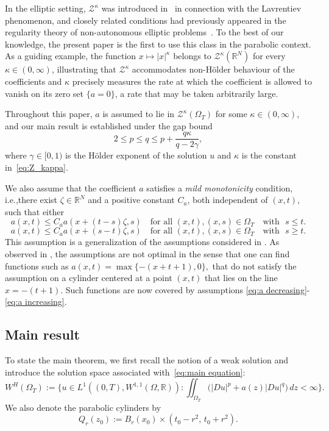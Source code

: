 \documentclass[10pt,a4paper]{amsart}
\numberwithin{equation}{section}
\newcommand{\RR}{\mathds{R}}
\begin{document}
In the elliptic setting, $\mathcal{Z}^{\kappa}$ was introduced
in~\cite{BCFM2023} in connection with the Lavrentiev phenomenon, and
closely related conditions had previously appeared in the regularity theory
of non-autonomous elliptic problems~\cite{HHL_2021, HOK2021, HOK2022}. To the best of
our knowledge, the present paper is the first to use this class in the
parabolic context. As a guiding example, the function $x \mapsto |x|^{\kappa}$
belongs to $\mathcal{Z}^{\kappa}(\RR^N)$ for every $\kappa \in (0,
\infty)$, illustrating that $\mathcal{Z}^{\kappa}$ accommodates
non-H\"older behaviour of the coefficients and $\kappa$
precisely measures the rate at which the coefficient is allowed to vanish on its zero set $\{a=0\}$, a rate that may be taken arbitrarily large.

Throughout this paper, $a$ is assumed to lie in
$\mathcal{Z}^{\kappa}(\Omega_T)$ for some $\kappa \in (0, \infty)$, and our main result is established under the gap bound
\begin{equation}\label{eq:new_upper_bound}
  2 \le p \le q \le p + \frac{q\kappa}{q - 2\gamma},
\end{equation}
where $\gamma \in [0, 1)$ is the H\"older exponent of the solution $u$ and
$\kappa$ is the constant in~\eqref{eq:Z_kappa}.

We also assume that the coefficient $a$ satisfies a \textit{mild monotonicity} condition, i.e.,there exist $\zeta \in \RR^N$ and a positive constant $C_a$, both independent of $(x,t)$, such that either 
\begin{equation}\label{eq:a decreasing}
    a(x,t) \leq C_a a(x+(t-s)\zeta,s) \quad \text{for all } (x,t),(x,s)\in \Omega_T \quad \text{with }\,\, s \leq t.
\end{equation}
\begin{equation}\label{eq:a increasing}
    a(x,t) \leq C_a a(x+(s-t)\zeta,s) \quad \text{for all } (x,t),(x,s)\in \Omega_T \quad \text{with }\,\, s \geq t.
\end{equation}
This assumption is a generalization of the assumptions considered in \cite{SS25}. As observed in \cite{SS25}, the assumptions are not optimal in the sense that one can find functions such as $a(x,t)=\max\{-(x+t+1), 0\},$ that do not satisfy the assumption on a cylinder centered at a point $(x,t)$ that lies on the line $x=-(t+1).$ Such functions are now covered by assumptions \eqref{eq:a decreasing}-\eqref{eq:a increasing}.
 \subsection{Main result} 
To state the main theorem, we first recall the notion of a weak solution and
introduce the solution space associated with~\eqref{eq:main equation}:
\begin{equation*}
  W^H(\Omega_T) := \biggl\{ u \in L^1((0,T), W^{1,1}(\Omega,\RR) ):
  \iint_{\Omega_T} \bigl(|Du|^p + a(z)|Du|^q\bigr) \, dz < \infty \biggr\}.
\end{equation*}
We also denote the parabolic cylinders by
\[
  Q_r(z_0) := B_r(x_0) \times (t_0 - r^2,\, t_0 + r^2).
\]
\end{document}
